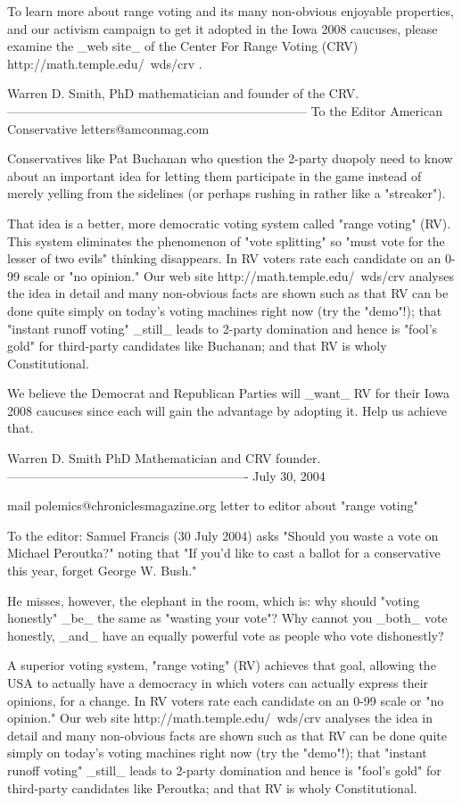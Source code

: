 To learn more about range voting and its many non-obvious enjoyable properties,
and our activism campaign to get it adopted in the Iowa 2008 caucuses,
please examine the _web site_ of the Center For Range Voting (CRV)
   http://math.temple.edu/~wds/crv .

Warren D. Smith,  PhD mathematician and founder of the CRV.
------------------------------------------------------------------------
To the Editor
American Conservative
letters@amconmag.com

Conservatives like Pat Buchanan who question the 2-party duopoly
need to know about an important idea for letting them participate
in the game instead of merely yelling from the sidelines
(or perhaps rushing in rather like a "streaker").

That idea is a better, more democratic voting system called "range voting" (RV).
This system eliminates the phenomenon of "vote splitting" so "must
vote for the lesser of two evils" thinking disappears.  In RV voters
rate each candidate on an 0-99 scale or "no opinion."  Our web site
   http://math.temple.edu/~wds/crv
analyses the idea in detail and many non-obvious facts are shown such as
that RV can be done quite simply on today's voting machines right now (try the "demo"!);
that "instant runoff voting"  _still_ leads to 2-party domination and hence
is "fool's gold" for third-party candidates like Buchanan; and that 
RV is wholy Constitutional.

We believe the Democrat and Republican Parties will _want_ RV for their Iowa 2008
caucuses since each will gain the advantage by adopting it.  Help us achieve that.

Warren D. Smith
PhD Mathematician and CRV founder.
----------------------------------------------------------
July 30, 2004

mail polemics@chroniclesmagazine.org
letter to editor about "range voting"

To the editor:
Samuel Francis (30 July 2004) asks
"Should you waste a vote on Michael Peroutka?"
noting that
"If you'd like to cast a ballot for a conservative this year, forget George W. Bush."

He misses, however, the elephant in the room, which is:
why should "voting honestly" _be_ the same as "wasting your vote"?  Why cannot you
_both_ vote honestly, _and_ have an equally powerful vote as people who vote dishonestly?

A superior voting system, "range voting" (RV) achieves that goal, allowing the USA to 
actually have a democracy in which voters can actually express their opinions,
for a change.  In RV voters rate each candidate on an 0-99 scale or 
"no opinion."  Our web site
   http://math.temple.edu/~wds/crv
analyses the idea in detail and many non-obvious facts are shown such as
that RV can be done quite simply on today's voting machines right now (try the "demo"!);
that "instant runoff voting"  _still_ leads to 2-party domination and hence
is "fool's gold" for third-party candidates like Peroutka; and that
RV is wholy Constitutional.

